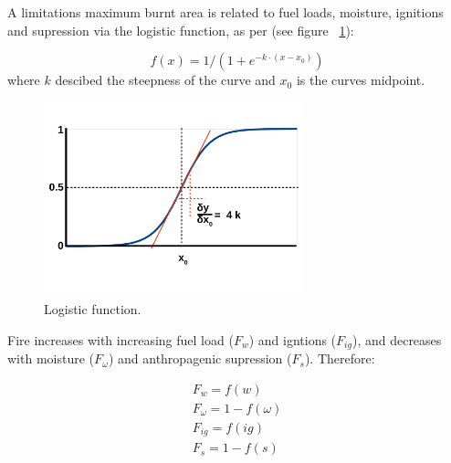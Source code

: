 A limitations maximum burnt area is related to fuel loads, moisture, ignitions and supression via the logistic function, as per \citet{bistinas2014causal} (see figure ~\ref{Logistic_fun_fig}):

\begin{equation}
    f(x) = 1 / (1 + e^{-k \cdot (x - x_0)})
    \label{equ:fx}
\end{equation}
where $k$ descibed the steepness of the curve and $x_0$ is the curves midpoint.

\begin{figure}[!ht]
  \centering
    \includegraphics[width=0.67\textwidth]{Logistic_fun.pdf}
  \caption{Logistic function.}
  \label{Logistic_fun_fig}
\end{figure}

Fire increases with increasing fuel load ($F_w$) and igntions ($F_{ig}$), and decreases with moisture ($F_{\omega}$) and anthropagenic supression ($F_s$). Therefore:

\begin{equation}
    \begin{split}
        F_{w} = f(w) \\
        F_{\omega} = 1 - f(\omega) \\
        F_{ig} = f(ig) \\
        F_{s} = 1- f(s)
    \end{split}
    \label{equ:LimFIRE.x}
\end{equation}



